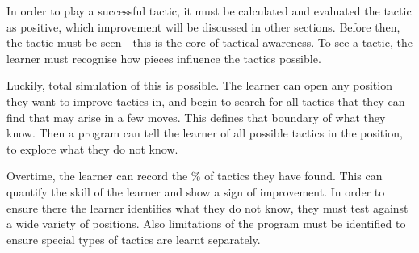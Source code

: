 \documentclass{article}
\begin{document}
In order to play a successful tactic, it must be calculated and evaluated the tactic as positive, which improvement will be discussed in other sections. Before then, the tactic must be seen - this is the core of tactical awareness. To see a tactic, the learner must recognise how pieces influence the tactics possible.

Luckily, total simulation of this is possible. The learner can open any position they want to improve tactics in, and begin to search for all tactics that they can find that may arise in a few moves. This defines that boundary of what they know. Then a program can tell the learner of all possible tactics in the position, to explore what they do not know.

Overtime, the learner can record the \% of tactics they have found. This can quantify the skill of the learner and show a sign of improvement. In order to ensure there the learner identifies what they do not know, they must test against a wide variety of positions. Also limitations of the program must be identified to ensure special types of tactics are learnt separately.
\end{document}
